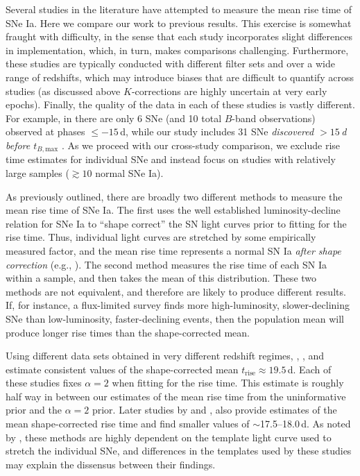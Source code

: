 \documentclass[twocolumn]{aastex63}
\newcommand{\trise}{$t_\mathrm{rise}$}
\newcommand{\tbmax}{$t_{B,\mathrm{max}}$}
\begin{document}
Several studies in the literature have attempted to measure the mean rise time
of SNe Ia. Here we compare our work to previous results. This exercise is
somewhat fraught with difficulty, in the sense that each study incorporates
slight differences in implementation, which, in turn, makes comparisons
challenging. Furthermore, these studies are typically conducted with different
filter sets and over a wide range of redshifts, which may introduce biases
that are difficult to quantify across studies (as discussed above
$K$-corrections are highly uncertain at very early epochs). Finally, the
quality of the data in each of these studies is vastly different. For example,
in \citet{Riess99a} there are only 6 SNe (and 10 total $B$-band observations)
observed at phases $\le -15$\,d, while our study includes 31 SNe
\textit{discovered $> 15$\,d before \tbmax} \citep{Yao19}. As we proceed with
our cross-study comparison, we exclude rise time estimates for individual SNe
and instead focus on studies with relatively large samples ($\gtrsim 10$
normal SNe Ia).

As previously outlined, there are broadly two different methods to measure the
mean rise time of SNe Ia. The first uses the well established
luminosity-decline relation for SNe Ia \citep{Phillips93} to ``shape correct''
the SN light curves prior to fitting for the rise time. Thus, individual light
curves are stretched by some empirically measured factor, and the mean rise
time represents a normal SN Ia \textit{after shape correction} (e.g.,
\citealt{Riess99a,Aldering00,Conley06,Hayden10,Ganeshalingam11}). The second
method measures the rise time of each SN Ia within a sample, and then takes
the mean of this distribution. These two methods are not equivalent, and
therefore are likely to produce different results. If, for instance, a
flux-limited survey finds more high-luminosity, slower-declining SNe than
low-luminosity, faster-declining events, then the population mean will produce
longer rise times than the shape-corrected mean.

Using different data sets obtained in very different redshift regimes,
\citet{Riess99a}, \citet{Aldering00}, and \citet{Conley06} estimate consistent
values of the shape-corrected mean \trise$ \approx 19.5$\,d. Each of these
studies fixes $\alpha = 2$ when fitting for the rise time. This estimate is
roughly half way in between our estimates of the mean rise time from the
uninformative prior and the $\alpha = 2$ prior. Later studies by
\citet{Hayden10} and \citet{Ganeshalingam11}, also provide estimates of the
mean shape-corrected rise time and find smaller values of $\sim$17.5--18.0\,d.
As noted by \citeauthor{Hayden10}, these methods are highly dependent on the
template light curve used to stretch the individual SNe, and differences in
the templates used by these studies may explain the dissensus between their
findings.
\end{document}
